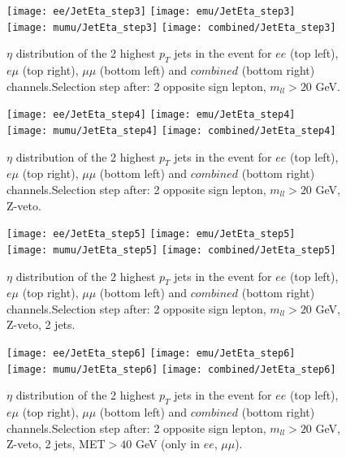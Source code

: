 \documentclass[12pt, a4paper, titlepage]{article}
\begin{document}
\clearpage
\newpage

\begin{figure}
  \texttt{[image: ee/JetEta\_step3]}
  \texttt{[image: emu/JetEta\_step3]}\\
  \texttt{[image: mumu/JetEta\_step3]}
  \texttt{[image: combined/JetEta\_step3]}
\caption{$\eta$ distribution of the 2 highest $p_T$ jets in the event for $ee$ (top left), $e\mu$ (top right), $\mu\mu$ (bottom left) and $combined$ (bottom right) channels.\newline Selection step after: 2 opposite sign lepton, $m_{ll}>20$ GeV.}
\end{figure}

\clearpage
\newpage


\begin{figure}
  \texttt{[image: ee/JetEta\_step4]}
  \texttt{[image: emu/JetEta\_step4]}\\
  \texttt{[image: mumu/JetEta\_step4]}
  \texttt{[image: combined/JetEta\_step4]}
\caption{$\eta$ distribution of the 2 highest $p_T$ jets in the event for $ee$ (top left), $e\mu$ (top right), $\mu\mu$ (bottom left) and $combined$ (bottom right) channels.\newline Selection step after: 2 opposite sign lepton, $m_{ll}>20$ GeV, Z-veto.}
\end{figure}

\clearpage
\newpage


\begin{figure}
  \texttt{[image: ee/JetEta\_step5]}
  \texttt{[image: emu/JetEta\_step5]}\\
  \texttt{[image: mumu/JetEta\_step5]}
  \texttt{[image: combined/JetEta\_step5]}
\caption{$\eta$ distribution of the 2 highest $p_T$ jets in the event for $ee$ (top left), $e\mu$ (top right), $\mu\mu$ (bottom left) and $combined$ (bottom right) channels.\newline Selection step after: 2 opposite sign lepton, $m_{ll}>20$ GeV, Z-veto, 2 jets.}
\end{figure}

\clearpage
\newpage


\begin{figure}
  \texttt{[image: ee/JetEta\_step6]}
  \texttt{[image: emu/JetEta\_step6]}\\
  \texttt{[image: mumu/JetEta\_step6]}
  \texttt{[image: combined/JetEta\_step6]}
\caption{$\eta$ distribution of the 2 highest $p_T$ jets in the event for $ee$ (top left), $e\mu$ (top right), $\mu\mu$ (bottom left) and $combined$ (bottom right) channels.\newline Selection step after: 2 opposite sign lepton, $m_{ll}>20$ GeV, Z-veto, 2 jets, MET$>40$ GeV (only in $ee$, $\mu\mu$).}
\end{figure}
\end{document}
